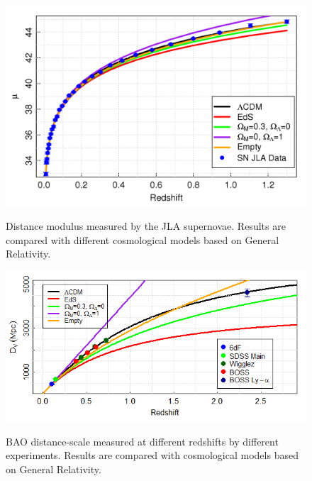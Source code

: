 \begin{figure}
\begin{center}
\includegraphics[width=1.0\textwidth]{./Pictures/distance_modulus.png}
\caption{Distance modulus measured by the JLA supernovae. Results are compared with different cosmological models based on General Relativity.}
\label{fig:snlcdm}
\vspace*{0.2cm}
\includegraphics[width=1.0\textwidth]{./Pictures/bao_dv.png}
\caption{BAO distance-scale measured at different redshifts by different experiments. Results are compared with cosmological models based on General Relativity.}
\label{fig:baolcdm}
\end{center}
\end{figure}

